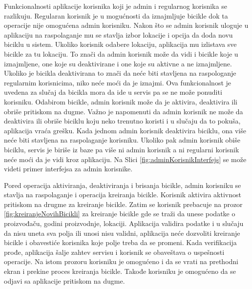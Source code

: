\documentclass[12pt,oneside]{memoir}
\begin{document}
 
Funkcionalnosti aplikacije korisnika koji je admin i regularnog korisnika se razlikuju. Regularan korisnik je u mogućnosti da iznajmljuje bicikle dok ta operacije nije omogućena admin korisniku. Nakon što se admin korisnik uloguje u aplikaciju na raspolaganje mu se stavlja izbor lokacije i opcija da doda novu biciklu u sistem. Ukoliko korisnik odabere lokaciju, aplikacija mu izlistava sve bicikle za tu lokaciju. To znači da admin korisnik može da vidi i bicikle koje u iznajmljene, one koje su deaktivirane i one koje su aktivne a ne iznajmljene. Ukoliko je bicikla deaktivirana to znači da neće biti stavljena na raspologanje regularnim korisnicima, niko neće moći da je iznajmi. Ova funkcionalnost je uvedena za slučaj da bicikla mora da ide u servis pa se ne može ponuditi korisniku. Odabirom bicikle, admin korisnik može da je aktivira, deaktivira ili obriše pritiskom na dugme. Važno je napomenuti da admin korisnik ne može da deaktivira ili obriše biciklu koju neko trenutno koristi i u slučaju da to pokuša, aplikacija vraća grešku. Kada jednom admin korisnik deaktivira biciklu, ona više neće biti stavljena na raspolaganje korisniku. Ukoliko pak admin korisnik obiše biciklu, servis je biriše iz baze pa više ni admin korisnik a ni regularni korisnik neće moći da je vidi kroz aplikaciju. Na Slici \ref{fig:adminKorisnikInterfejs} se može videti primer interfejsa za admin korisnike.


Pored operacija aktiviranja, deaktiviranja i brisanja bicikle, admin korisniku se stavlja na raspolaganje i operacija kreiranja bicikle. Korisnik aktivira aktivnost pritiskom na drugme za kreiranje bicikle. Zatim se korisnik prebacuje na prozor \ref{fig:kreiranjeNovihBicikli} za kreiranje bicikle gde se traži da unese podatke o proizvođaču, godini proizvodnje, lokaciji. Aplikacija validira podatke i u slučaju da nisu uneta sva polja ili unosi nisu validni, aplikacija neće dozvoliti kreiranje bicikle i obavestiće korisnika koje polje treba da se promeni. Kada verifikacija prođe, aplikacija šalje zahtev servisu i korisnik se obaveštava o uspešnosti operacije. Na istom prozoru korisniku je omogućeno i da se vrati na prethodni ekran i prekine proces kreiranja bicikle. Takođe korisniku je omogućeno da se odjavi sa aplikacije pritiskom na dugme.
 
\end{document}
